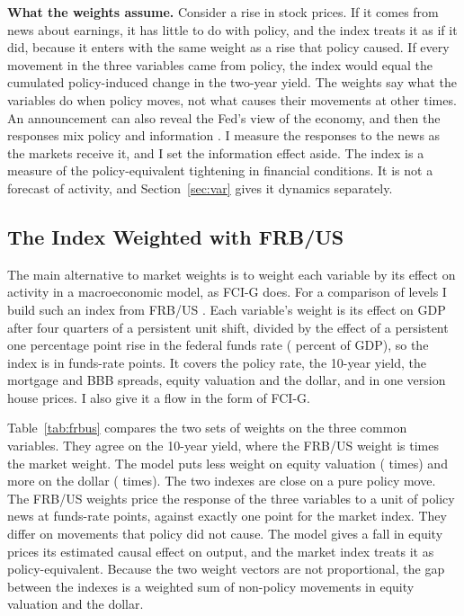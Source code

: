 \documentclass[11pt]{article}
\begin{document}


\textbf{What the weights assume.} Consider a rise in stock prices. If it comes from news about earnings, it has little to do with policy, and the index treats it as if it did, because it enters with the same weight as a rise that policy caused. If every movement in the three variables came from policy, the index would equal the cumulated policy-induced change in the two-year yield. The weights say what the variables do when policy moves, not what causes their movements at other times. An announcement can also reveal the Fed's view of the economy, and then the responses mix policy and information \citep{nakamura2018}. I measure the responses to the news as the markets receive it, and I set the information effect aside. The index is a measure of the policy-equivalent tightening in financial conditions. It is not a forecast of activity, and Section~\ref{sec:var} gives it dynamics separately.

\subsection{The Index Weighted with FRB/US}\label{sec:frbus}
The main alternative to market weights is to weight each variable by its effect on activity in a macroeconomic model, as FCI-G does. For a comparison of levels I build such an index from FRB/US \citep{brayton2014}. Each variable's weight is its effect on GDP after four quarters of a persistent unit shift, divided by the effect of a persistent one percentage point rise in the federal funds rate ( percent of GDP), so the index is in funds-rate points. It covers the policy rate, the 10-year yield, the mortgage and BBB spreads, equity valuation and the dollar, and in one version house prices. I also give it a flow in the form of FCI-G.

Table~\ref{tab:frbus} compares the two sets of weights on the three common variables. They agree on the 10-year yield, where the FRB/US weight is  times the market weight. The model puts less weight on equity valuation ( times) and more on the dollar ( times). The two indexes are close on a pure policy move. The FRB/US weights price the response of the three variables to a unit of policy news at  funds-rate points, against exactly one point for the market index. They differ on movements that policy did not cause. The model gives a fall in equity prices its estimated causal effect on output, and the market index treats it as policy-equivalent. Because the two weight vectors are not proportional, the gap between the indexes is a weighted sum of non-policy movements in equity valuation and the dollar.
\end{document}
